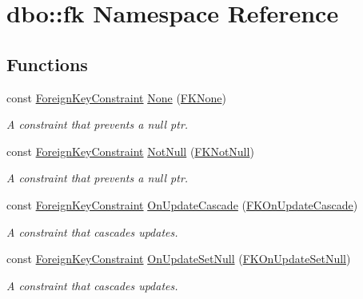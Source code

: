 \hypertarget{namespacedbo_1_1fk}{\section{dbo\+:\+:fk Namespace Reference}
\label{namespacedbo_1_1fk}
}
\subsection*{Functions}
\begin{DoxyCompactItemize}
\item 
const \hyperlink{classdbo_1_1_foreign_key_constraint}{Foreign\+Key\+Constraint} \hyperlink{namespacedbo_1_1fk_a074c2f3bc21f375877f9b6b67710c848}{None} (\hyperlink{namespacedbo_a852726cb6e354fe0b7427952d7ee9bbd}{F\+K\+None})
\begin{DoxyCompactList}\small\item\em A constraint that prevents a {\ttfamily null} ptr. \end{DoxyCompactList}\item 
const \hyperlink{classdbo_1_1_foreign_key_constraint}{Foreign\+Key\+Constraint} \hyperlink{namespacedbo_1_1fk_ad0d91eae612ebf7978662e948c5c4363}{Not\+Null} (\hyperlink{namespacedbo_aaee974161f0dade23c6dbd3aa44a145b}{F\+K\+Not\+Null})
\begin{DoxyCompactList}\small\item\em A constraint that prevents a {\ttfamily null} ptr. \end{DoxyCompactList}\item 
const \hyperlink{classdbo_1_1_foreign_key_constraint}{Foreign\+Key\+Constraint} \hyperlink{namespacedbo_1_1fk_a00c09046d5885af90f78fdb0ffbc751d}{On\+Update\+Cascade} (\hyperlink{namespacedbo_ad015d5bfa1c6cfd1efbb7b6e97eb22ae}{F\+K\+On\+Update\+Cascade})
\begin{DoxyCompactList}\small\item\em A constraint that cascades updates. \end{DoxyCompactList}\item 
const \hyperlink{classdbo_1_1_foreign_key_constraint}{Foreign\+Key\+Constraint} \hyperlink{namespacedbo_1_1fk_adcedfa8d9519fac76fe9b74185c6a078}{On\+Update\+Set\+Null} (\hyperlink{namespacedbo_ac28416e0d117ea1806ceee4558b0f96b}{F\+K\+On\+Update\+Set\+Null})
\begin{DoxyCompactList}\small\item\em A constraint that cascades updates. \end{DoxyCompactList}\item 

\end{DoxyCompactItemize}
